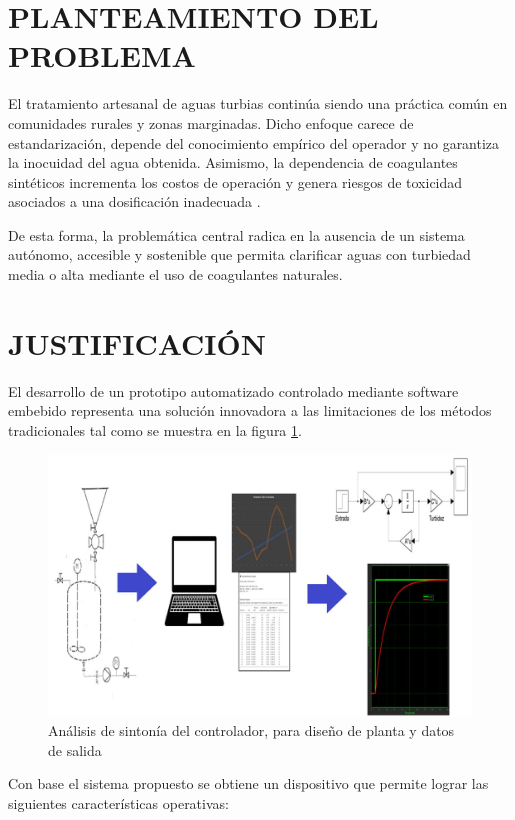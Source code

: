 \documentclass[conference]{IEEEtran}
\begin{document}
	\section{ PLANTEAMIENTO DEL PROBLEMA}
	
	El tratamiento artesanal de aguas turbias continúa siendo una práctica común en comunidades rurales y zonas marginadas. Dicho enfoque carece de estandarización, depende del conocimiento empírico del operador y no garantiza la inocuidad del agua obtenida. Asimismo, la dependencia de coagulantes sintéticos incrementa los costos de operación y genera riesgos de toxicidad asociados a una dosificación inadecuada \cite{b6}.
	
	De esta forma, la problemática central radica en la ausencia de un sistema autónomo, accesible y sostenible que permita clarificar aguas con turbiedad media o alta mediante el uso de coagulantes naturales.
	
	\section{JUSTIFICACIÓN}
	El desarrollo de un prototipo automatizado controlado mediante software embebido representa una solución innovadora a las limitaciones de los métodos tradicionales tal como se muestra en la figura \ref{fig:2}. 
	
	\begin{figure}[htbp]
		\centering
		\includegraphics[width=\columnwidth]{fig2.jpg}
		\caption{Análisis de sintonía del controlador, para diseño de planta y datos de salida}
		\label{fig:2}
	\end{figure}
	
	Con base el sistema propuesto se obtiene un dispositivo que permite lograr las siguientes características operativas:
	
\end{document}

